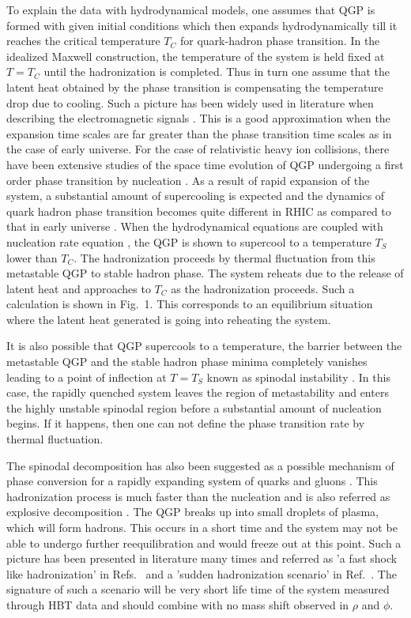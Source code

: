  To explain the data with hydrodynamical models, one assumes that QGP 
is formed with given initial conditions which then expands
hydrodynamically till it reaches the critical temperature $T_C$ for 
quark-hadron phase transition.
  In the idealized Maxwell construction, the temperature of the system 
is held fixed at $T=T_C$ until the hadronization is completed. 
Thus in turn one assume that the latent heat obtained by the phase 
transition is compensating the temperature drop due to cooling.
Such a picture has been widely used in literature when describing
the electromagnetic signals \cite{SRIVASTAVA}.
  This is a good approximation when the expansion time scales are far 
greater than the phase transition time scales as in the case of early 
universe. 
  For the case of relativistic heavy ion collisions, there have
been extensive studies of the space time evolution of 
QGP undergoing a first order phase transition by nucleation
\cite{CSER,SHUK,INHOMO,ZABPC}.
  As a result of rapid expansion of the system, a substantial amount of 
supercooling is expected and the dynamics of quark hadron phase 
transition becomes quite different in RHIC as compared to that 
in early universe \cite{INHOMO,AKM}. 
 When the hydrodynamical equations are coupled with nucleation rate 
equation \cite{INHOMO}, the QGP is shown to supercool to a temperature 
$T_S$ lower than $T_C$. The hadronization proceeds by thermal fluctuation
from this metastable QGP to stable hadron phase. The system 
reheats due to the release of latent heat and approaches to $T_C$ as 
the hadronization proceeds. Such a calculation is shown in Fig.~1.
This corresponds to an equilibrium situation where the latent heat 
generated is going into reheating the system. 

It is also possible that QGP supercools to a temperature,
the barrier between the metastable QGP and the stable hadron phase minima 
completely vanishes leading to a point of inflection at $T=T_S$ known as 
spinodal instability \cite{SPINO}. In this case, the rapidly quenched system 
leaves the region of metastability and enters the highly unstable spinodal 
region before a substantial amount of nucleation begins.
If it happens, then one can not define the phase transition rate by 
thermal fluctuation.

   The spinodal decomposition has also been suggested as a
possible mechanism of phase conversion for a rapidly expanding system of 
quarks and gluons \cite{SPINO,DUMHEP,DUMPRL}. This hadronization process
is much faster than the nucleation and is  
also referred as explosive decomposition \cite{DUMEXP}.
 The QGP breaks up into small droplets of plasma, which will form hadrons. 
 This occurs in a short time and the system may not be able to undergo 
further reequilibration and would freeze out at this point. 
  Such a picture has been presented in literature many times
and referred as 'a fast shock like hadronization' in 
Refs.~\cite{CSORGO} and a 'sudden hadronization scenario' in 
Ref.~\cite{RAFEL}.
  The signature of such a scenario will be very short life time 
\cite{CSERNAI} of the system measured through HBT data \cite{NA49,PHEN} 
and should combine with no mass shift observed in $\rho$ and $\phi$.

